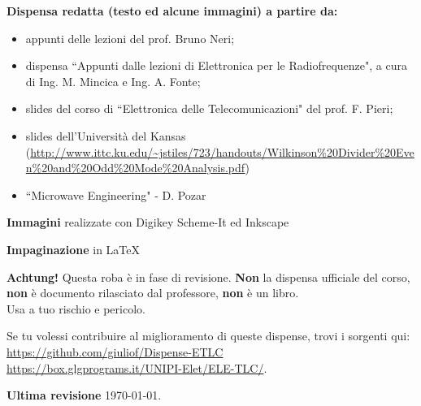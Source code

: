 \documentclass[12pt,a4paper]{book}
\begin{document}
  
  \textbf{Dispensa redatta (testo ed alcune immagini) a partire da:}
  \begin{itemize}
  \item appunti delle lezioni del prof. Bruno Neri;
  \item dispensa ``Appunti dalle lezioni di
  Elettronica per le Radiofrequenze", a cura di Ing. M. Mincica e Ing. A. Fonte;
  \item slides del corso di ``Elettronica delle Telecomunicazioni" del prof. F. Pieri;
  \item slides dell'Università del Kansas (\url{http://www.ittc.ku.edu/~jstiles/723/handouts/Wilkinson%20Divider%20Even%20and%20Odd%20Mode%20Analysis.pdf})
  \item ``Microwave Engineering" - D. Pozar
  \end{itemize}
  
  \textbf{Immagini} realizzate con Digikey\textsuperscript{\textregistered{}} Scheme-It\textsuperscript{\textregistered{}} ed Inkscape
  
  \textbf{Impaginazione} in \LaTeX
  
  \textbf{Achtung!} Questa roba è in fase di revisione. \textbf{Non} la dispensa ufficiale del corso, \textbf{non} è documento rilasciato dal professore, \textbf{non} è un libro.
  \\
  Usa a tuo rischio e pericolo.
  
  Se tu volessi contribuire al miglioramento di queste dispense, trovi i sorgenti qui:\\
  \url{https://github.com/giuliof/Dispense-ETLC}\\
  \url{https://box.glgprograms.it/UNIPI-Elet/ELE-TLC/}.
  
  \textbf{Ultima revisione} \today.
  
  \tableofcontents
  
  
  \mainmatter
  
  
  
  
  
  
  
  
\end{document}
